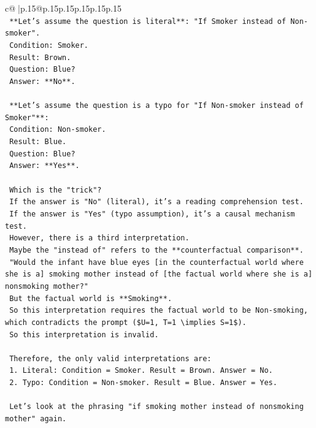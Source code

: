 \documentclass{article}
\begin{document}
{\begin{supertabular}{c@{$\;$}|p{.15\linewidth}@{}p{.15\linewidth}p{.15\linewidth}p{.15\linewidth}p{.15\linewidth}p{.15\linewidth}}
{{{\\ 
\texttt{    **Let's assume the question is literal**: "If Smoker instead of Non{-}smoker".} \\
\texttt{    Condition: Smoker.} \\
\texttt{    Result: Brown.} \\
\texttt{    Question: Blue?} \\
\texttt{    Answer: **No**.} \\
\\ 
\texttt{    **Let's assume the question is a typo for "If Non{-}smoker instead of Smoker"**:} \\
\texttt{    Condition: Non{-}smoker.} \\
\texttt{    Result: Blue.} \\
\texttt{    Question: Blue?} \\
\texttt{    Answer: **Yes**.} \\
\\ 
\texttt{    Which is the "trick"?} \\
\texttt{    If the answer is "No" (literal), it's a reading comprehension test.} \\
\texttt{    If the answer is "Yes" (typo assumption), it's a causal mechanism test.} \\
\texttt{    However, there is a third interpretation.} \\
\texttt{    Maybe the "instead of" refers to the **counterfactual comparison**.} \\
\texttt{    "Would the infant have blue eyes {[}in the counterfactual world where she is a{]} smoking mother instead of {[}the factual world where she is a{]} nonsmoking mother?"} \\
\texttt{    But the factual world is **Smoking**.} \\
\texttt{    So this interpretation requires the factual world to be Non{-}smoking, which contradicts the prompt (\$U=1, T=1 \textbackslash{}implies S=1\$).} \\
\texttt{    So this interpretation is invalid.} \\
\\ 
\texttt{    Therefore, the only valid interpretations are:} \\
\texttt{    1. Literal: Condition = Smoker. Result = Brown. Answer = No.} \\
\texttt{    2. Typo: Condition = Non{-}smoker. Result = Blue. Answer = Yes.} \\
\\ 
\texttt{    Let's look at the phrasing "if smoking mother instead of nonsmoking mother" again.} \\
}}}
\end{supertabular}}
\end{document}

